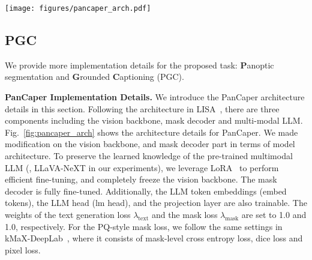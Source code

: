 \begin{figure*}[ht!]
    \centering
    \texttt{[image: figures/pancaper\_arch.pdf]}
    \caption{\textbf{Architecture of PanCaper.} We utilize a pretrained vision encoder from kMaX-DeepLab~\cite{yu2022kmaxdeeplab} as our vision backbone, which effectively extracts dense features essential for panoptic segmentation.}
    \label{fig:pancaper_arch}
\end{figure*}






\subsection{PGC}
\label{subsec:pgc}
We provide more implementation details for the proposed task: \textbf{P}anoptic segmentation and \textbf{G}rounded \textbf{C}aptioning (PGC).

\noindent\textbf{PanCaper Implementation Details.} We introduce the PanCaper architecture details in this section. Following the architecture in LISA~\cite{lai2024lisa}, there are three components including the vision backbone, mask decoder and multi-modal LLM. Fig.~\ref{fig:pancaper_arch} shows the architecture details for PanCaper. We made modification on the vision backbone, and mask decoder part in terms of model architecture. To preserve the learned knowledge of the pre-trained multimodal LLM (\ie, LLaVA-NeXT in our experiments), we leverage LoRA~\cite{hu2021lora} to perform efficient fine-tuning, and completely freeze the vision backbone. The mask decoder is fully fine-tuned. Additionally, the LLM token embeddings (embed tokens), the LLM head (lm head), and the projection layer are also trainable.
The weights of the text generation loss $\lambda_{\text{text}}$  and the mask
loss $\lambda_{\text{mask}}$ are set to 1.0 and 1.0, respectively. For the PQ-style mask loss, we follow the same settings in kMaX-DeepLab~\cite{yu2022kmaxdeeplab}, where it consists of mask-level cross entropy loss, dice loss and pixel loss.


